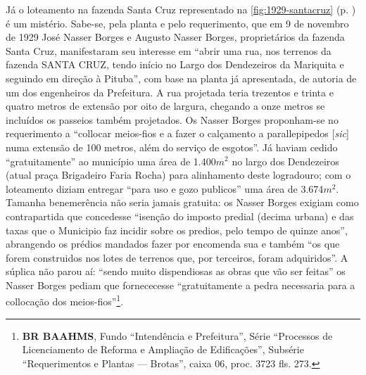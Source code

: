 Já o loteamento na fazenda Santa Cruz representado na \autoref{fig:1929-santacruz} (p. \pageref{fig:1929-santacruz}) é um mistério. Sabe-se, pela planta e pelo requerimento, que em 9 de novembro de 1929 José Nasser Borges e Augusto Nasser Borges, proprietários da fazenda Santa Cruz, manifestaram seu interesse em ``abrir uma rua, nos terrenos da fazenda SANTA CRUZ, tendo início no Largo dos Dendezeiros da Mariquita e seguindo em direção à Pituba'', com base na planta já apresentada, de autoria de um dos engenheiros da Prefeitura. A rua projetada teria trezentos e trinta e quatro metros de extensão por oito de largura, chegando a onze metros se incluídos os passeios também projetados. Os Nasser Borges proponham-se no requerimento a ``collocar meios-fios e a fazer o calçamento a parallepipedos [\textit{sic}] numa extensão de 100 metros, além do serviço de esgotos''. Já haviam cedido ``gratuitamente'' ao município uma área de 1.400$m^{2}$ no largo dos Dendezeiros (atual praça Brigadeiro Faria Rocha) para alinhamento deste logradouro; com o loteamento diziam entregar ``para uso e gozo publicos'' uma área de 3.674$m^{2}$. Tamanha benemerência não seria jamais gratuita: os Nasser Borges exigiam como contrapartida que concedesse ``isenção do imposto predial (decima urbana) e das taxas que o Municipio faz incidir sobre os predios, pelo tempo de quinze anos'', abrangendo os prédios mandados fazer por encomenda sua e também ``os que forem construidos nos lotes de terrenos que, por terceiros, foram adquiridos''. A súplica não parou aí: ``sendo muito dispendiosas as obras que vão ser feitas'' os Nasser Borges pediam que fornececesse ``gratuitamente a pedra necessaria para a collocação dos meios-fios''\footnote{\textbf{BR BAAHMS}, Fundo ``Intendência e Prefeitura'', Série ``Processos de Licenciamento de Reforma e Ampliação de Edificações'', Subsérie ``Requerimentos e Plantas --- Brotas'', caixa 06, proc. 3723 fls. 273.}.

